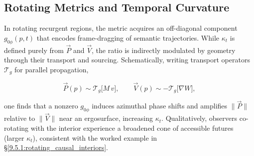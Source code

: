 
\subsection{Rotating Metrics and Temporal Curvature}
\label{10.5.3:rotating_metrics_and_temporal_curvature}

In rotating recurgent regions, the metric acquires an off-diagonal component \(g_{0\phi}(p,t)\) that encodes frame-dragging of semantic trajectories. While \(\kappa_t\) is defined purely from \(\vec{P}\) and \(\vec{V}\), the ratio is indirectly modulated by geometry through their transport and sourcing. Schematically, writing transport operators \(\mathcal{T}_{g}\) for parallel propagation,

\begin{equation}
\vec{P}(p) \sim \mathcal{T}_{g}\big[ M\, v \big], \qquad \vec{V}(p) \sim -\mathcal{T}_{g}\big[ \nabla W \big],
\end{equation}

one finds that a nonzero \(g_{0\phi}\) induces azimuthal phase shifts and amplifies \(\|\vec{P}\|\) relative to \(\|\vec{V}\|\) near an ergosurface, increasing \(\kappa_t\). Qualitatively, observers co-rotating with the interior experience a broadened cone of accessible futures (larger \(\kappa_t\)), consistent with the worked example in \S\ref{9.5.1:rotating_causal_interiors}.
